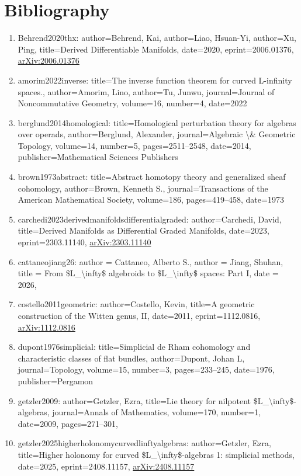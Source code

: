\documentclass[11pt]{article}
\begin{document}
\section*{Bibliography}
\begin{enumerate}[leftmargin=*]
  \item Behrend2020thx: author=Behrend, Kai, author=Liao, Hsuan-Yi, author=Xu, Ping, title=Derived Differentiable Manifolds, date=2020, eprint=2006.01376, \href{https://arxiv.org/abs/2006.01376}{arXiv:2006.01376}
  \item amorim2022inverse: title=The inverse function theorem for curved L-infinity spaces., author=Amorim, Lino, author=Tu, Junwu, journal=Journal of Noncommutative Geometry, volume=16, number=4, date=2022
  \item berglund2014homological: title=Homological perturbation theory for algebras over operads, author=Berglund, Alexander, journal=Algebraic \textbackslash{}\& Geometric Topology, volume=14, number=5, pages=2511--2548, date=2014, publisher=Mathematical Sciences Publishers
  \item brown1973abstract: title=Abstract homotopy theory and generalized sheaf cohomology, author=Brown, Kenneth S., journal=Transactions of the American Mathematical Society, volume=186, pages=419--458, date=1973
  \item carchedi2023derivedmanifoldsdifferentialgraded: author=Carchedi, David, title=Derived Manifolds as Differential Graded Manifolds, date=2023, eprint=2303.11140, \href{https://arxiv.org/abs/2303.11140}{arXiv:2303.11140}
  \item cattaneojiang26: author = Cattaneo, Alberto S., author = Jiang, Shuhan, title = From \$L\_\textbackslash{}infty\$ algebroids to \$L\_\textbackslash{}infty\$ spaces: Part I, date = 2026,
  \item costello2011geometric: author=Costello, Kevin, title=A geometric construction of the Witten genus, II, date=2011, eprint=1112.0816, \href{https://arxiv.org/abs/1112.0816}{arXiv:1112.0816}
  \item dupont1976simplicial: title=Simplicial de Rham cohomology and characteristic classes of flat bundles, author=Dupont, Johan L, journal=Topology, volume=15, number=3, pages=233--245, date=1976, publisher=Pergamon
  \item getzler2009: author=Getzler, Ezra, title=Lie theory for nilpotent \$L\_\textbackslash{}infty\$-algebras, journal=Annals of Mathematics, volume=170, number=1, date=2009, pages=271--301,
  \item getzler2025higherholonomycurvedlinftyalgebras: author=Getzler, Ezra, title=Higher holonomy for curved \$L\_\textbackslash{}infty\$-algebras 1: simplicial methods, date=2025, eprint=2408.11157, \href{https://arxiv.org/abs/2408.11157}{arXiv:2408.11157}

\end{enumerate}
\end{document}
